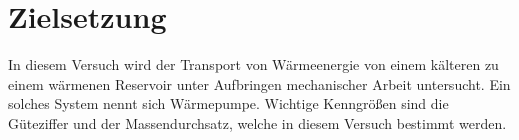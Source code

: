 \section{Zielsetzung}

In diesem Versuch wird der Transport von Wärmeenergie von einem kälteren zu einem
wärmenen Reservoir unter Aufbringen mechanischer Arbeit untersucht. Ein solches System
nennt sich Wärmepumpe. Wichtige Kenngrößen sind die Güteziffer und der Massendurchsatz,
welche in diesem Versuch bestimmt werden.

\label{sec:Zielsetzung}
